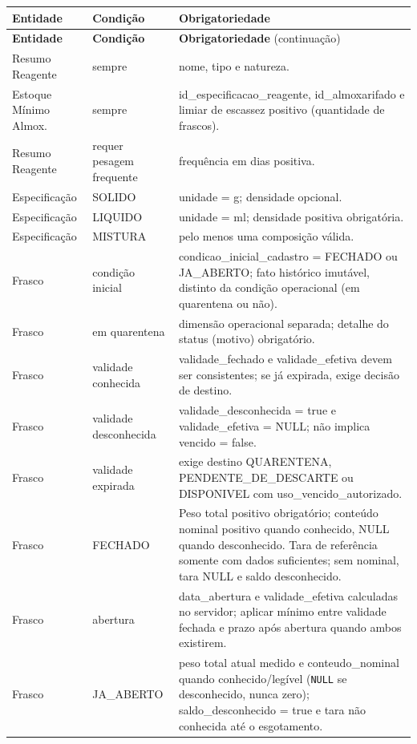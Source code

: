 \small
\setlength{\tabcolsep}{5pt}
\begin{longtable}{>{\raggedright\arraybackslash}p{} >{\raggedright\arraybackslash}p{} >{\raggedright\arraybackslash}p{}}
\toprule
\textbf{Entidade} & \textbf{Condição} & \textbf{Obrigatoriedade}\\
\midrule
\endfirsthead
\toprule
\textbf{Entidade} & \textbf{Condição} & \textbf{Obrigatoriedade} (continuação)\\
\midrule
\endhead
\bottomrule
\endfoot
Resumo Reagente & sempre & nome, tipo e natureza.\\
Estoque Mínimo Almox. & sempre & id\_especificacao\_reagente, id\_almoxarifado e limiar de escassez positivo (quantidade de frascos).\\
Resumo Reagente & requer pesagem frequente & frequência em dias positiva.\\
Especificação & SOLIDO & unidade = g; densidade opcional.\\
Especificação & LIQUIDO & unidade = ml; densidade positiva obrigatória.\\
Especificação & MISTURA & pelo menos uma composição válida.\\
Frasco & condição inicial & condicao\_inicial\_cadastro = FECHADO ou JA\_ABERTO; fato histórico imutável, distinto da condição operacional (em quarentena ou não).\\
Frasco & em quarentena & dimensão operacional separada; detalhe do status (motivo) obrigatório.\\
Frasco & validade conhecida & validade\_fechado e validade\_efetiva devem ser consistentes; se já expirada, exige decisão de destino.\\
Frasco & validade desconhecida & validade\_desconhecida = true e validade\_efetiva = NULL; não implica vencido = false.\\
Frasco & validade expirada & exige destino QUARENTENA, PENDENTE\_DE\_DESCARTE ou DISPONIVEL com uso\_vencido\_autorizado.\\
Frasco & FECHADO & Peso total positivo obrigatório; conteúdo nominal positivo quando conhecido, NULL quando desconhecido. Tara de referência somente com dados suficientes; sem nominal, tara NULL e saldo desconhecido.\\
Frasco & abertura & data\_abertura e validade\_efetiva calculadas no servidor; aplicar mínimo entre validade fechada e prazo após abertura quando ambos existirem.\\
Frasco & JA\_ABERTO & peso total atual medido e conteudo\_nominal quando conhecido/leg\'ivel (\texttt{NULL} se desconhecido, nunca zero); saldo\_desconhecido = true e tara n\~ao conhecida at\'e o esgotamento.\\

\end{longtable}
